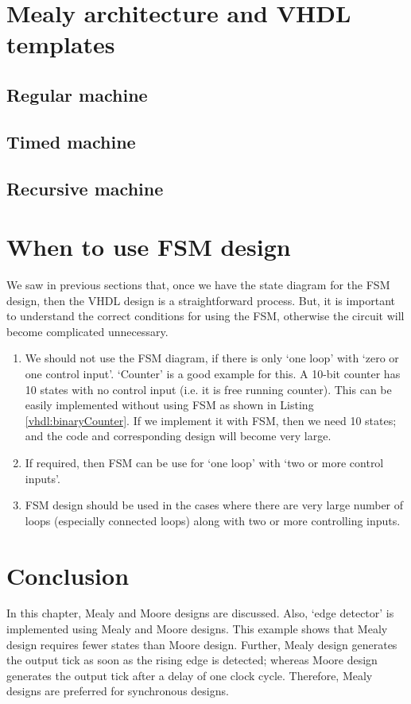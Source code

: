 \section{Mealy architecture and VHDL templates} \label{sec:MealyTemplates}
\subsection{Regular machine}




\subsection{Timed machine}
\subsection{Recursive machine}


\section{When to use FSM design}
We saw in previous sections that, once we have the state diagram for the FSM design, then the VHDL design is a straightforward process. But, it is important to understand the correct conditions for using the FSM, otherwise the circuit will become complicated unnecessary. 

\begin{enumerate}
	\item We should not use the FSM diagram, if there is only `one loop' with `zero or one control input'. `Counter' is a good example for this. A 10-bit counter has 10 states with no control input (i.e. it is free running counter). This can be easily implemented without using FSM as shown in Listing \ref{vhdl:binaryCounter}. If we implement it with FSM, then we need 10 states; and the code and corresponding design will become very large. 
	
	\item If required, then FSM can be use for `one loop' with `two or more control inputs'. 
	
	\item FSM design should be used in the cases where there are very large number of loops (especially connected loops) along with two or more controlling inputs. 
	
\end{enumerate}
\section{Conclusion}
In this chapter, Mealy and Moore designs are discussed. Also, `edge detector' is implemented using Mealy and Moore designs. This example shows that Mealy design requires fewer states than Moore design. Further, Mealy design generates the output tick as soon as the rising edge is detected; whereas Moore design generates the output tick after a delay of one clock cycle. Therefore, Mealy designs are preferred for synchronous designs. 
